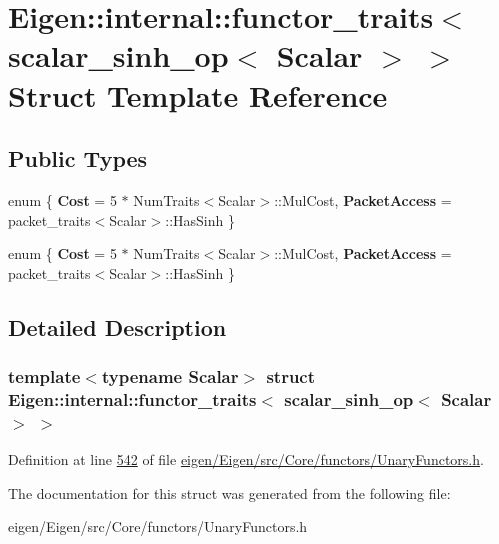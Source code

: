 \hypertarget{struct_eigen_1_1internal_1_1functor__traits_3_01scalar__sinh__op_3_01_scalar_01_4_01_4}{}\section{Eigen\+:\+:internal\+:\+:functor\+\_\+traits$<$ scalar\+\_\+sinh\+\_\+op$<$ Scalar $>$ $>$ Struct Template Reference}
\label{struct_eigen_1_1internal_1_1functor__traits_3_01scalar__sinh__op_3_01_scalar_01_4_01_4}
\subsection*{Public Types}
\begin{DoxyCompactItemize}
\item 
\mbox{\label{struct_eigen_1_1internal_1_1functor__traits_3_01scalar__sinh__op_3_01_scalar_01_4_01_4_a02f97e4859ecade387b5815bb62609a8}} 
enum \{ {\bfseries Cost} = 5 $\ast$ Num\+Traits$<$Scalar$>$\+:\+:Mul\+Cost, 
{\bfseries Packet\+Access} = packet\+\_\+traits$<$Scalar$>$\+:\+:Has\+Sinh
 \}
\item 
\mbox{\label{struct_eigen_1_1internal_1_1functor__traits_3_01scalar__sinh__op_3_01_scalar_01_4_01_4_add4e0e6d03957d40e854632d2290fc4e}} 
enum \{ {\bfseries Cost} = 5 $\ast$ Num\+Traits$<$Scalar$>$\+:\+:Mul\+Cost, 
{\bfseries Packet\+Access} = packet\+\_\+traits$<$Scalar$>$\+:\+:Has\+Sinh
 \}
\end{DoxyCompactItemize}


\subsection{Detailed Description}
\subsubsection*{template$<$typename Scalar$>$\newline
struct Eigen\+::internal\+::functor\+\_\+traits$<$ scalar\+\_\+sinh\+\_\+op$<$ Scalar $>$ $>$}



Definition at line \hyperlink{eigen_2_eigen_2src_2_core_2functors_2_unary_functors_8h_source_l00542}{542} of file \hyperlink{eigen_2_eigen_2src_2_core_2functors_2_unary_functors_8h_source}{eigen/\+Eigen/src/\+Core/functors/\+Unary\+Functors.\+h}.



The documentation for this struct was generated from the following file\+:\begin{DoxyCompactItemize}
\item 
eigen/\+Eigen/src/\+Core/functors/\+Unary\+Functors.\+h\end{DoxyCompactItemize}

